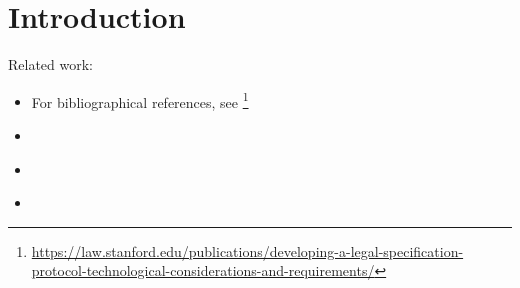 \section{Introduction}\label{sec:introduction}

Related work:

\begin{itemize}
\item For bibliographical references, see
  \footnote{\url{https://law.stanford.edu/publications/developing-a-legal-specification-protocol-technological-considerations-and-requirements/}}
\item \cite{sergot_kowalski_etal__british_nationality_acm_1986,kowalski_legislation_logic_programs_1995}
\item \cite{libal_steen_nai_suite_draft_reason_legal_texts_jurix_2019}
\item \cite{governatori_carnead_defeas_logic_icail_2011}
\end{itemize}




